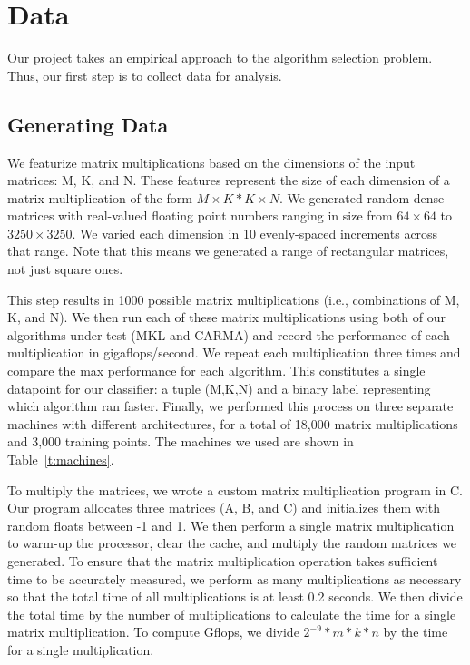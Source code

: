 \section{Data}
Our project takes an empirical approach to the algorithm selection problem.
Thus, our first step is to collect data for analysis.

\subsection{Generating Data}
We featurize matrix multiplications based on the dimensions of the input matrices: M, K, and N.
These features represent the size of each dimension of a matrix multiplication of the form $M\times{K} * K\times{N}$.
We generated random dense matrices with real-valued floating point numbers ranging in size from $64\times{64}$ to $3250\times{3250}$.
We varied each dimension in 10 evenly-spaced increments across that range.
Note that this means we generated a range of rectangular matrices, not just square ones.

This step results in 1000 possible matrix multiplications (i.e., combinations of M, K, and N).
We then run each of these matrix multiplications using both of our algorithms under test (MKL and CARMA) and record the performance of each multiplication in gigaflops/second.
We repeat each multiplication three times and compare the max performance for each algorithm.
This constitutes a single datapoint for our classifier: a tuple (M,K,N) and a binary label representing which algorithm ran faster.
Finally, we performed this process on three separate machines with different architectures, for a total of 18,000 matrix multiplications and 3,000 training points.
The machines we used are shown in Table~\ref{t:machines}.

To multiply the matrices, we wrote a custom matrix multiplication program in C.
Our program allocates three matrices (A, B, and C) and initializes them with random floats between -1 and 1.
We then perform a single matrix multiplication to warm-up the processor, clear the cache, and multiply the random matrices we generated.
To ensure that the matrix multiplication operation takes sufficient time to be accurately measured, we perform as many multiplications as necessary so that the total time of all multiplications is at least 0.2 seconds.
We then divide the total time by the number of multiplications to calculate the time for a single matrix multiplication.
To compute Gflops, we divide $2^{-9} * m * k * n$ by the time for a single multiplication.

